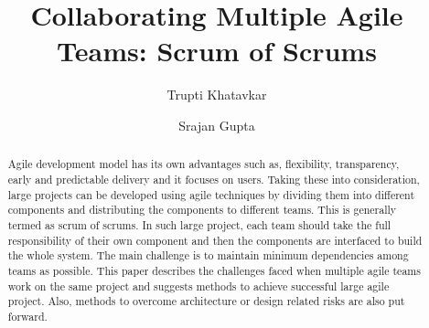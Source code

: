 \documentclass[sigconf]{acmart}
\begin{document}
%
\title{Collaborating Multiple Agile Teams: Scrum of Scrums}

%

\author{Trupti Khatavkar}

\author{Srajan Gupta}

%
\begin{abstract}
Agile development model has its own advantages such as, flexibility, transparency, early and predictable delivery and it focuses on users. Taking these into consideration, large projects can be developed using agile techniques by dividing them into different components and distributing the components to different teams. This is generally termed as scrum of scrums. In such large project, each team should take the full responsibility of their own component and then the components are interfaced to build the whole system. The main challenge is to maintain minimum dependencies among teams as possible. This paper describes the challenges faced when multiple agile teams work on the same project and suggests methods to achieve successful large agile project. Also, methods to overcome architecture or design related risks are also put forward.
\end{abstract}


%

%


%
\maketitle
\end{document}
